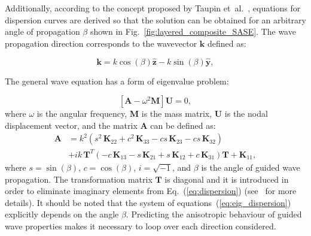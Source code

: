 \documentclass[preprint,12pt]{elsarticle}
\newcommand{\matr}[1]{\mathbf{#1}} %
\newcommand{\vect}[1]{\mathbf{#1}} %
\providecommand{\DIFaddtex}[1]{{\protect\color{blue}\uwave{#1}}} %
\providecommand{\DIFaddbegin}{} %
\providecommand{\DIFaddend}{} %
\providecommand{\DIFdelbegin}{} %
\providecommand{\DIFdelend}{} %
\providecommand{\DIFadd}[1]{\texorpdfstring{\DIFaddtex{#1}}{#1}} %
\begin{document}
	Additionally, according to the concept proposed by Taupin et~al.~\cite{Taupin2011}, equations for dispersion curves are derived so that the solution can be obtained for an arbitrary angle of propagation $\beta$ shown in Fig.~\ref{fig:layered_composite_SASE}. The wave propagation direction corresponds to the wavevector $\vect{k}$ defined as:

	\DIFdelbegin %
\DIFdelend \DIFaddbegin \begin{equation}
	  \vect{k} = k \cos (\beta)\hat{ \vect{z}} - k \sin (\beta) \hat{\vect{y}},
		\label{eq:wavevector}
	\end{equation}\DIFaddend 
	\DIFdelbegin %

\DIFdelend \DIFaddbegin \DIFadd{where $\hat{ \vect{z}} $ and $\hat{\vect{y}}$ are unit vectors. }\DIFaddend The general wave equation has a form of eigenvalue problem:

	\begin{equation}
	\left[\matr{A} - \omega^2\matr{M} \right] \vect{U} =0,
	\label{eq:eig_dispersion}
	\end{equation}
	where $\omega$ is the angular frequency, $\matr{M}$ is the mass matrix, $\matr{U}$ is the nodal displacement vector, and the matrix $\matr{A}$ can be defined as:
	\begin{equation}
	\begin{aligned}
	\matr{A} & =  k^2\left(s^2 \,\matr{K}_{22} + c^2\, \matr{K}_{33} - c s\, \matr{K}_{23} - c s\, \matr{K}_{32}\right) \\
	& + i k\, \matr{T}^T\left(-c\, \matr{K}_{13} - s\, \matr{K}_{21} + s\, \matr{K}_{12} + c\, \matr{K}_{31}\right) \matr{T} +\matr{K}_{11},
	\end{aligned}
	\label{eq:dispersion}
	\end{equation}
	where  $s = \sin(\beta)$, $c = \cos(\beta)$, $i = \sqrt{-1}$, and $\beta$ is the angle of guided wave propagation. The transformation matrix $\matr{T}$ is diagonal and it is introduced in order to eliminate imaginary elements from Eq.~(\ref{eq:dispersion}) (see~\cite{Bartoli2006} for more details). It should be noted that the system of equations~(\ref{eq:eig_dispersion}) explicitly depends on the angle $\beta$. Predicting the anisotropic behaviour of guided wave properties makes it necessary to loop over each direction considered.
\end{document}
